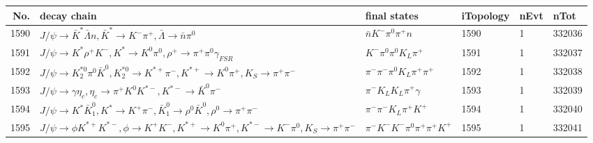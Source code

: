 \begin{table}[htbp] 
\begin{center}
\begin{small}
\begin{tabular}{rlllll}\hline\hline
 No. & decay chain & final states &  iTopology & nEvt & nTot \\\hline
1590&$J/\psi       \rightarrow \bar{K}^{*}   \bar{\Lambda}    n                 , \bar{K}^{*}    \rightarrow K^{-}          \pi^{+}        , \bar{\Lambda}     \rightarrow \bar{n}          \pi^{0}        $&$\bar{n}          K^{-}          \pi^{0}        \pi^{+}        n                 $& 1590&    1&332036\\
1591&$J/\psi       \rightarrow K^{*}          \rho^{+}      K^{-}          , K^{*}           \rightarrow K^{0}          \pi^{0}        , \rho^{+}       \rightarrow \pi^{+}        \pi^{0}        \gamma_{FSR} $&$K^{-}          \pi^{0}        \pi^{0}        K_{L}          \pi^{+}        $& 1591&    1&332037\\
1592&$J/\psi       \rightarrow K_2^{*0}       \pi^{0}        \bar{K}^{0}   , K_2^{*0}        \rightarrow K^{*+}         \pi^{-}        , K^{*+}          \rightarrow K^{0}          \pi^{+}        , K_{S}           \rightarrow \pi^{+}        \pi^{-}        $&$\pi^{-}        \pi^{-}        \pi^{0}        K_{L}          \pi^{+}        \pi^{+}        $& 1592&    1&332038\\
1593&$J/\psi       \rightarrow \gamma       \eta_{c}    , \eta_{c}     \rightarrow \pi^{+}        K^{0}          K^{*-}         , K^{*-}          \rightarrow \bar{K}^{0}   \pi^{-}        $&$\pi^{-}        K_{L}          K_{L}          \pi^{+}        \gamma       $& 1593&    1&332039\\
1594&$J/\psi       \rightarrow K^{*}          \bar{K}_1^{0} , K^{*}           \rightarrow K^{+}          \pi^{-}        , \bar{K}_1^{0}  \rightarrow \rho^{0}      \bar{K}^{0}   , \rho^{0}       \rightarrow \pi^{+}        \pi^{-}        $&$\pi^{-}        \pi^{-}        K_{L}          \pi^{+}        K^{+}          $& 1594&    1&332040\\
1595&$J/\psi       \rightarrow \phi           K^{*+}         K^{*-}         , \phi            \rightarrow K^{+}          K^{-}          , K^{*+}          \rightarrow K^{0}          \pi^{+}        , K^{*-}          \rightarrow K^{-}          \pi^{0}        , K_{S}           \rightarrow \pi^{+}        \pi^{-}        $&$\pi^{-}        K^{-}          K^{-}          \pi^{0}        \pi^{+}        \pi^{+}        K^{+}          $& 1595&    1&332041\\

\end{tabular}
\end{small}
\end{center}
\end{table}
